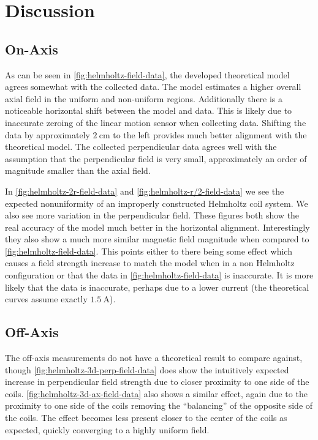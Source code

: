 \documentclass[10pt, twocolumn]{article}
\theoremstyle{definition}
\begin{document}
\section{Discussion}
\subsection{On-Axis}
As can be seen in \cref{fig:helmholtz-field-data}, the developed theoretical model agrees somewhat with the collected data. The model estimates a higher overall axial field in the uniform and non-uniform regions. Additionally there is a noticeable horizontal shift between the model and data. This is likely due to inaccurate zeroing of the linear motion sensor when collecting data. Shifting the data by approximately $\qty{2}{\centi\meter}$ to the left provides much better alignment with the theoretical model. The collected perpendicular data agrees well with the assumption that the perpendicular field is very small, approximately an order of magnitude smaller than the axial field.

In \cref{fig:helmholtz-2r-field-data} and \cref{fig:helmholtz-r/2-field-data} we see the expected nonuniformity of an improperly constructed Helmholtz coil system. We also see more variation in the perpendicular field. These figures both show the real accuracy of the model much better in the horizontal alignment. Interestingly they also show a much more similar magnetic field magnitude when compared to \cref{fig:helmholtz-field-data}. This points either to there being some effect which causes a field strength increase to match the model when in a non Helmholtz configuration or that the data in \cref{fig:helmholtz-field-data} is inaccurate. It is more likely that the data is inaccurate, perhaps due to a lower current (the theoretical curves assume exactly $\qty{1.5}{\ampere}$).
\subsection{Off-Axis}
The off-axis measurements do not have a theoretical result to compare against, though \cref{fig:helmholtz-3d-perp-field-data} does show the intuitively expected increase in perpendicular field strength due to closer proximity to one side of the coils. \cref{fig:helmholtz-3d-ax-field-data} also shows a similar effect, again due to the proximity to one side of the coils removing the ``balancing'' of the opposite side of the coils. The effect becomes less present closer to the center of the coils as expected, quickly converging to a highly uniform field.


\end{document}
